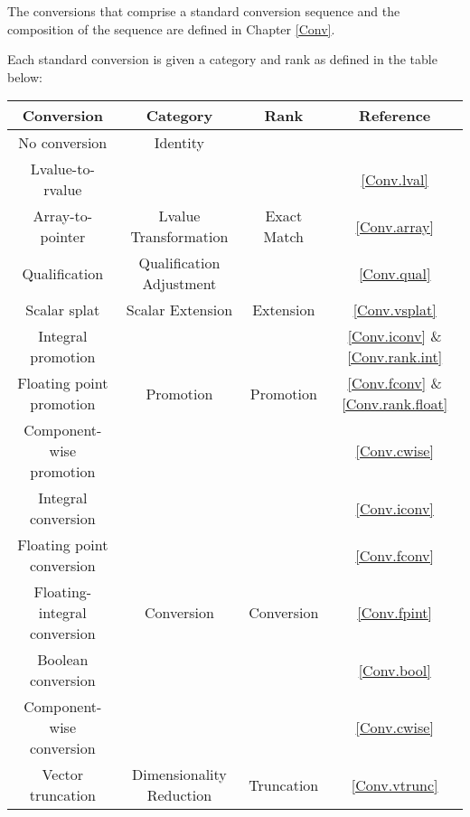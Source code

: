 
\p The conversions that comprise a standard conversion sequence and the
composition of the sequence are defined in Chapter \ref{Conv}.

\p Each standard conversion is given a category and rank as defined in the table
below:
\begin{center}
  \begin{tabular}{|| c | c | c | c ||}
    \hline
    Conversion & Category & Rank & Reference \\
    \hline
    No conversion & Identity &  & \\ \cline{1-2}\cline{4-4}

    Lvalue-to-rvalue & & & \ref{Conv.lval} \\ \cline{4-4}
    Array-to-pointer & Lvalue Transformation & Exact Match
          & \ref{Conv.array} \\ \cline{1-2}\cline{4-4}
    Qualification & Qualification Adjustment & & \ref{Conv.qual} \\ \cline{1-4}

    Scalar splat & Scalar Extension & Extension
          & \ref{Conv.vsplat} \\ \cline{1-4}

    Integral promotion & &
          & \ref{Conv.iconv} \& \ref{Conv.rank.int} \\ \cline{1-1}\cline{4-4}
    Floating point promotion & Promotion & Promotion
          & \ref{Conv.fconv} \& \ref{Conv.rank.float} \\ \cline{1-1}\cline{4-4}
    Component-wise promotion &  &  & \ref{Conv.cwise} \\ \cline{1-4}

    Integral conversion & & & \ref{Conv.iconv} \\ \cline{1-1}\cline{4-4}
    Floating point conversion &  &  & \ref{Conv.fconv} \\ \cline{1-1}\cline{4-4}
    Floating-integral conversion & Conversion & Conversion
          & \ref{Conv.fpint} \\ \cline{1-1}\cline{4-4}
    Boolean conversion &  &  & \ref{Conv.bool} \\ \cline{1-1}\cline{4-4}
    Component-wise conversion &  &  & \ref{Conv.cwise} \\ \cline{1-4}

    Vector truncation & Dimensionality Reduction & Truncation
          & \ref{Conv.vtrunc} \\ \cline{1-4}
    \hline
  \end{tabular}
\end{center}

